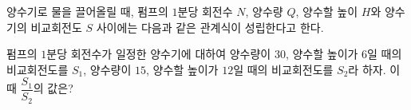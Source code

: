 양수기로 물을 끌어올릴 때, 펌프의 $1$분당 회전수 $N$, 양수량 $Q$, 양수할 높이 $H$와 양수기의 비교회전도 $S$ 사이에는 다음과 같은 관계식이 성립한다고 한다. \par\smallskip{}\par\smallskip\noindent 펌프의 $1$분당 회전수가 일정한 양수기에 대하여 양수량이 $30$, 양수할 높이가 $6$일 때의 비교회전도를 $S_1$, 양수량이 $15$, 양수할 높이가 $12$일 때의 비교회전도를 $S_2$라 하자. 이때 $\dfrac{S_1}{S_2}$의 값은? 

